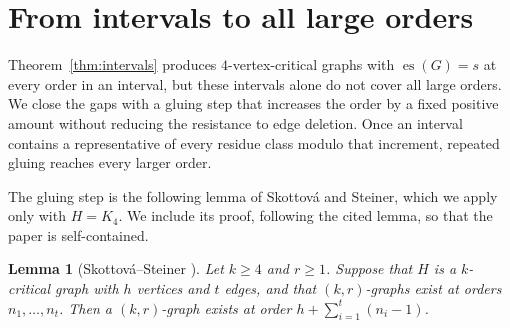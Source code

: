 \documentclass[11pt,letterpaper]{article}
\numberwithin{equation}{section}
\theoremstyle{plain}
\newtheorem{lemma}[theorem]{Lemma}
\theoremstyle{definition}
\theoremstyle{remark}
\DeclareMathOperator{\es}{es}
\begin{document}
\section{From intervals to all large orders}\label{sec:gluing}

Theorem~\ref{thm:intervals} produces $4$-vertex-critical graphs with $\es(G)=s$ at every order in an interval, but these intervals alone do not cover all large orders. We close the gaps with a gluing step that increases the order by a fixed positive amount without reducing the resistance to edge deletion. Once an interval contains a representative of every residue class modulo that increment, repeated gluing reaches every larger order.

The gluing step is the following lemma of Skottov\'a and Steiner, which we apply only with $H=K_4$. We include its proof, following the cited lemma, so that the paper is self-contained.

\begin{lemma}[Skottov\'a--Steiner {\cite[Lemma~2.1]{SkottovaSteiner}}]\label{lem:gluing}
Let $k\ge 4$ and $r\ge 1$. Suppose that $H$ is a $k$-critical graph with $h$ vertices and $t$ edges, and that $(k,r)$-graphs exist at orders $n_1,\dots,n_t$. Then a $(k,r)$-graph exists at order $h+\sum_{i=1}^t (n_i-1)$.
\end{lemma}
\end{document}

